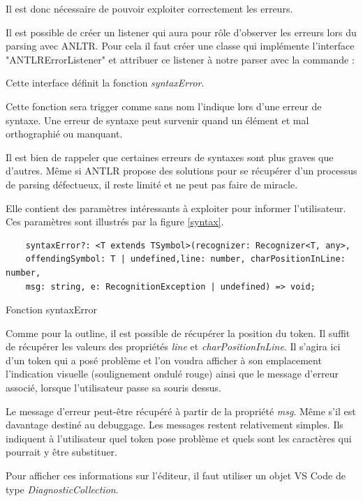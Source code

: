 \documentclass[
    iict, %
    il, %
]{heig-tb}
\begin{document}
Il est donc nécessaire de pouvoir exploiter correctement les erreurs.

Il est possible de créer un listener qui aura pour rôle d'observer les erreurs lors du parsing avec ANLTR.
Pour cela il faut créer une classe qui implémente l'interface "ANTLRErrorListener" et attribuer ce listener à notre parser
avec la commande :

Cette interface définit la fonction \emph{syntaxError}.

Cette fonction sera trigger comme sans nom l'indique lors d'une erreur de syntaxe.
Une erreur de syntaxe peut survenir quand un élément et mal orthographié ou manquant.

Il est bien de rappeler que certaines erreurs de syntaxes sont plus graves que d'autres.
Même si ANTLR propose des solutions pour se récupérer d'un processus de parsing défectueux, il reste limité et ne peut pas faire de miracle.

Elle contient des paramètres intéressants à exploiter pour informer l'utilisateur.
Ces paramètres sont illustrés par la figure \ref{syntax}.

\begin{listing}[!ht]
    \begin{verbatim}
    syntaxError?: <T extends TSymbol>(recognizer: Recognizer<T, any>,
    offendingSymbol: T | undefined,line: number, charPositionInLine: number,
    msg: string, e: RecognitionException | undefined) => void;
    \end{verbatim}
    \caption{Fonction syntaxError}
    \label{syntaxError}
\end{listing}

Comme pour la outline, il est possible de récupérer la position du token. Il suffit de récupérer les valeurs des propriétés \emph{line} et \emph{charPositionInLine}.
Il s'agira ici d'un token qui a posé problème et l'on voudra afficher à son emplacement l'indication visuelle (soulignement ondulé rouge) ainsi que le message d'erreur associé, lorsque l'utilisateur passe
sa souris dessus.

Le message d'erreur peut-être récupéré à partir de la propriété \emph{msg}. Même s'il est davantage destiné au debuggage.
Les messages restent relativement simples. Ils indiquent à l'utilisateur quel token pose problème et quels sont les caractères qui pourrait y être substituer.

Pour afficher ces informations sur l'éditeur, il faut utiliser un objet VS Code de type \emph{DiagnosticCollection}.
\end{document}
